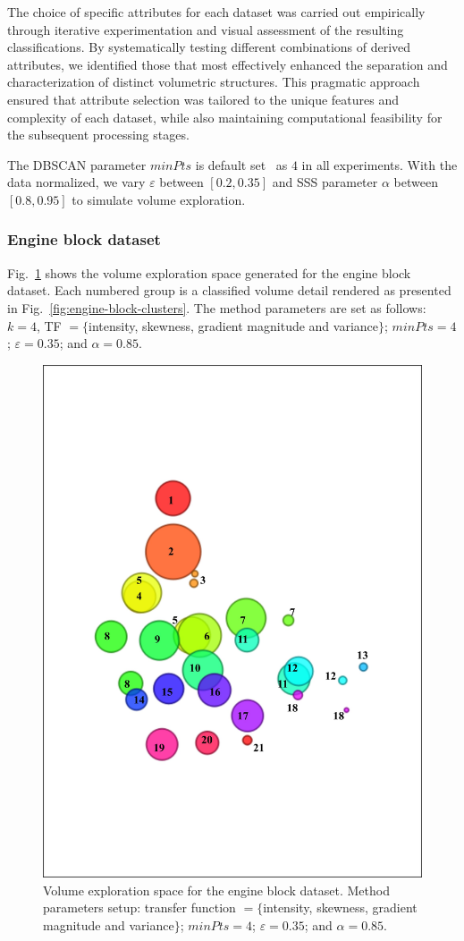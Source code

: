 The choice of specific attributes for each dataset was carried out empirically through iterative experimentation and visual assessment of the resulting classifications. By systematically testing different combinations of derived attributes, we identified those that most effectively enhanced the separation and characterization of distinct volumetric structures. This pragmatic approach ensured that attribute selection was tailored to the unique features and complexity of each dataset, while also maintaining computational feasibility for the subsequent processing stages.

The DBSCAN parameter $minPts$ is default set~\cite{ester1996} as $4$ in all experiments. With the data normalized, we vary $\varepsilon$ between $\left[ 0.2, 0.35\right]$ and SSS parameter $\alpha$  between $\left[0.8, 0.95\right]$ to simulate volume exploration.

\subsubsection{Engine block dataset}
\label{subsubsec:engine-block}

Fig.~\ref{fig:engine-block-clusters-tf} shows the volume exploration space generated for the engine block dataset. Each numbered group is a classified volume detail rendered as presented in Fig.~\ref{fig:engine-block-clusters}. The method parameters are set as follows: $k=4$, TF $=\{$intensity, skewness, gradient magnitude and variance$\}$; $minPts = 4$; $\varepsilon = 0.35$; and $\alpha = 0.85$. 

\begin{figure}[htb!]
    \centering
    \includegraphics[width=0.7\columnwidth]{figs/engine-block-clusters-tf.jpg}
    \caption{Volume exploration space for the engine block dataset. Method parameters setup: transfer function $=\{$intensity, skewness, gradient magnitude and variance$\}$; $minPts = 4$;  $\varepsilon = 0.35$; and $\alpha = 0.85$.}
    \label{fig:engine-block-clusters-tf}
\end{figure}

